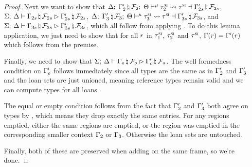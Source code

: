 \begin{proof}
  Next we want to show that
  $\Delta; \; \Gamma_2^\prime \, \natural \, \mathcal{F}_2; \; \Theta \vdash^{\mu} \tau^\textsc{si}_2 \leadsto \tau^\textsc{si} \dashv \Gamma_{2s}^\prime \, \natural \, \mathcal{F}_{2s}$,
  $\Sigma; \: \Delta \vdash \Gamma_{2s} \, \natural \, \mathcal{F}_{2s} \rhd \Gamma_{2s}^\prime \, \natural \, \mathcal{F}_{2s}$,
  $\Delta; \; \Gamma_3^\prime \, \natural \, \mathcal{F}_3; \; \Theta \vdash^{\mu} \tau^\textsc{si}_3 \leadsto \tau^\textsc{si} \dashv \Gamma_{3s}^\prime \, \natural \, \mathcal{F}_{3s}$,
  and
  $\Sigma; \: \Delta \vdash \Gamma_{3s} \, \natural \, \mathcal{F}_{3s} \rhd \Gamma_{3s}^\prime \, \natural \, \mathcal{F}_{3s}$,
  which all follow from applying . To do
  this lemma application, we just need to show that for all $r$ in
  $\tau^\textsc{si}_1$, $\tau^\textsc{si}_2$ and $\tau^\textsc{si}$, $\Gamma(r) =
  \Gamma^\prime(r)$ which follows from the premise.

  Finally, we need to show that
  $\Sigma; \: \Delta \vdash \Gamma_o \, \natural \, \mathcal{F}_o \rhd \Gamma_o^\prime \, \natural \, \mathcal{F}_o$.
  The well formedness condition on $\Gamma_o^\prime$ follows immediately
  since all types are the same as in $\Gamma_2^\prime$ and
  $\Gamma_3^\prime$ and the loan sets are just unioned, meaning reference
  types remain valid and we can compute types for all loans.

  The equal or empty condition follows from the fact that $\Gamma_2^\prime$
  and $\Gamma_3^\prime$ both agree on types by
  , which means they drop exactly
  the same entries. For any regions emptied, either the same regions are
  emptied, or the region was emptied in the corresponding smaller context
  $\Gamma_2$ or $\Gamma_3$. Otherwise the loan sets are untouched.

  Finally, both of these are preserved when adding on the same frame, so we're
  done.


\end{proof}
